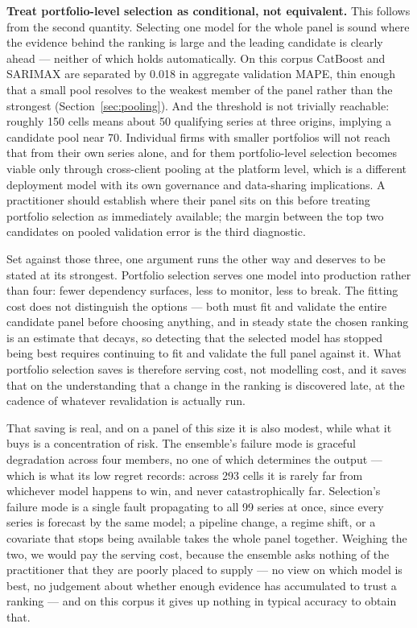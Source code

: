 \documentclass[11pt]{article}
\begin{document}
\textbf{Treat portfolio-level selection as conditional, not equivalent.} This follows from the second quantity. Selecting one model for the whole panel is sound where the evidence behind the ranking is large and the leading candidate is clearly ahead --- neither of which holds automatically. On this corpus CatBoost and SARIMAX are separated by 0.018 in aggregate validation MAPE, thin enough that a small pool resolves to the weakest member of the panel rather than the strongest (Section~\ref{sec:pooling}). And the threshold is not trivially reachable: roughly 150 cells means about 50 qualifying series at three origins, implying a candidate pool near 70. Individual firms with smaller portfolios will not reach that from their own series alone, and for them portfolio-level selection becomes viable only through cross-client pooling at the platform level, which is a different deployment model with its own governance and data-sharing implications. A practitioner should establish where their panel sits on this before treating portfolio selection as immediately available; the margin between the top two candidates on pooled validation error is the third diagnostic.

Set against those three, one argument runs the other way and deserves to be stated at its strongest. Portfolio selection serves one model into production rather than four: fewer dependency surfaces, less to monitor, less to break. The fitting cost does not distinguish the options --- both must fit and validate the entire candidate panel before choosing anything, and in steady state the chosen ranking is an estimate that decays, so detecting that the selected model has stopped being best requires continuing to fit and validate the full panel against it. What portfolio selection saves is therefore serving cost, not modelling cost, and it saves that on the understanding that a change in the ranking is discovered late, at the cadence of whatever revalidation is actually run.

That saving is real, and on a panel of this size it is also modest, while what it buys is a concentration of risk. The ensemble's failure mode is graceful degradation across four members, no one of which determines the output --- which is what its low regret records: across 293 cells it is rarely far from whichever model happens to win, and never catastrophically far. Selection's failure mode is a single fault propagating to all 99 series at once, since every series is forecast by the same model; a pipeline change, a regime shift, or a covariate that stops being available takes the whole panel together. Weighing the two, we would pay the serving cost, because the ensemble asks nothing of the practitioner that they are poorly placed to supply --- no view on which model is best, no judgement about whether enough evidence has accumulated to trust a ranking --- and on this corpus it gives up nothing in typical accuracy to obtain that.
\end{document}
